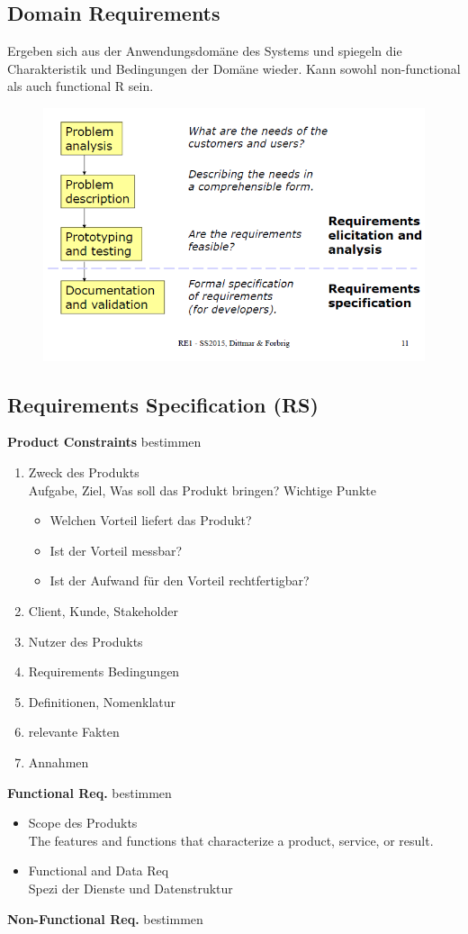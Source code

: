 \subsection{Domain Requirements}
Ergeben sich aus der Anwendungsdomäne des Systems und spiegeln die Charakteristik und Bedingungen der Domäne wieder. Kann sowohl non-functional als auch functional R sein.

\begin{figure}[!h]
	\centering
	\includegraphics[scale=0.5]{img/define_req.png}
\end{figure}

\subsection{Requirements Specification (RS)}
\textbf{Product Constraints} bestimmen
\begin{enumerate}
	\item Zweck des Produkts\\
	Aufgabe, Ziel, Was soll das Produkt bringen? Wichtige Punkte
	\begin{itemize}
		\item Welchen Vorteil liefert das Produkt?
		\item Ist der Vorteil messbar?
		\item Ist der Aufwand für den Vorteil rechtfertigbar?
	\end{itemize}
	\item Client, Kunde, Stakeholder
	\item Nutzer des Produkts
	\item Requirements Bedingungen
	\item Definitionen, Nomenklatur
	\item relevante Fakten
	\item Annahmen
\end{enumerate}
\textbf{Functional Req.} bestimmen
\begin{itemize}
	\item Scope des Produkts\\
	The features and functions that characterize a product, service, or result.
	\item Functional and Data Req\\
	Spezi der Dienste und Datenstruktur
\end{itemize}
\textbf{Non-Functional Req.} bestimmen

